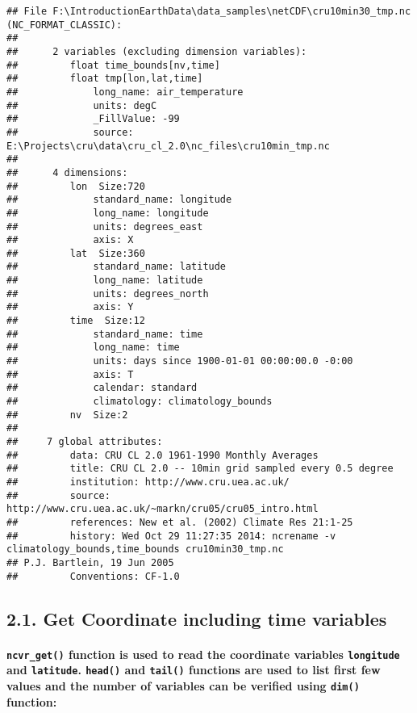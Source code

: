 \documentclass[]{article}
\let\oldparagraph\paragraph
\renewcommand{\paragraph}[1]{\oldparagraph{#1}\mbox{}}
\begin{document}
\begin{verbatim}
## File F:\IntroductionEarthData\data_samples\netCDF\cru10min30_tmp.nc (NC_FORMAT_CLASSIC):
## 
##      2 variables (excluding dimension variables):
##         float time_bounds[nv,time]   
##         float tmp[lon,lat,time]   
##             long_name: air_temperature
##             units: degC
##             _FillValue: -99
##             source: E:\Projects\cru\data\cru_cl_2.0\nc_files\cru10min_tmp.nc
## 
##      4 dimensions:
##         lon  Size:720
##             standard_name: longitude
##             long_name: longitude
##             units: degrees_east
##             axis: X
##         lat  Size:360
##             standard_name: latitude
##             long_name: latitude
##             units: degrees_north
##             axis: Y
##         time  Size:12
##             standard_name: time
##             long_name: time
##             units: days since 1900-01-01 00:00:00.0 -0:00
##             axis: T
##             calendar: standard
##             climatology: climatology_bounds
##         nv  Size:2
## 
##     7 global attributes:
##         data: CRU CL 2.0 1961-1990 Monthly Averages
##         title: CRU CL 2.0 -- 10min grid sampled every 0.5 degree
##         institution: http://www.cru.uea.ac.uk/
##         source: http://www.cru.uea.ac.uk/~markn/cru05/cru05_intro.html
##         references: New et al. (2002) Climate Res 21:1-25
##         history: Wed Oct 29 11:27:35 2014: ncrename -v climatology_bounds,time_bounds cru10min30_tmp.nc
## P.J. Bartlein, 19 Jun 2005
##         Conventions: CF-1.0
\end{verbatim}

\subsection{2.1. Get Coordinate including time
variables}\label{get-coordinate-including-time-variables}

\paragraph{\texorpdfstring{\texttt{ncvr\_get()} function is used to read
the coordinate variables \texttt{longitude} and \texttt{latitude}.
\texttt{head()} and \texttt{tail()} functions are used to list first few
values and the number of variables can be verified using \texttt{dim()}
function:}{ncvr\_get() function is used to read the coordinate variables longitude and latitude. head() and tail() functions are used to list first few values and the number of variables can be verified using dim() function:}}\label{ncvr_get-function-is-used-to-read-the-coordinate-variables-longitude-and-latitude.-head-and-tail-functions-are-used-to-list-first-few-values-and-the-number-of-variables-can-be-verified-using-dim-function}
\end{document}
